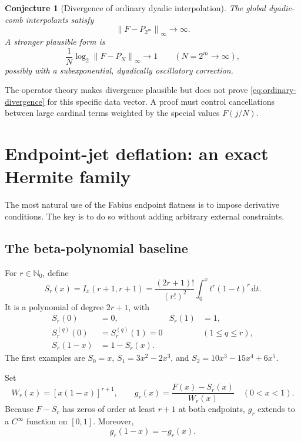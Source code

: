 \documentclass[11pt,oneside]{article}
\newtheorem{conjecture}[theorem]{Conjecture}
\theoremstyle{definition}
\theoremstyle{remark}
\newcommand{\N}{\mathbb N}
\newcommand{\dd}{\,\mathrm d}
\newcommand{\norm}[1]{\left\lVert #1\right\rVert}
\begin{document}
\begin{conjecture}[Divergence of ordinary dyadic interpolation]
\label{conj:ordinary-divergence}
The global dyadic-comb interpolants satisfy
\begin{equation}
 \norm{F-P_{2^m}}_\infty\longrightarrow\infty.
 \label{eq:ordinary-divergence}
\end{equation}
A stronger plausible form is
\begin{equation}
 \frac{1}{N}\log_2\norm{F-P_N}_\infty\longrightarrow1
 \qquad(N=2^m\to\infty),
 \label{eq:ordinary-rate-conj}
\end{equation}
possibly with a subexponential, dyadically oscillatory correction.
\end{conjecture}

The operator theory makes divergence plausible but does not prove \eqref{eq:ordinary-divergence} for this specific data vector.  A proof must control cancellations between large cardinal terms weighted by the special values $F(j/N)$.

\section{Endpoint-jet deflation: an exact Hermite family}
\label{sec:jet-family}

The most natural use of the Fabius endpoint flatness is to impose derivative conditions.  The key is to do so without adding arbitrary external constraints.

\subsection{The beta-polynomial baseline}

For $r\in\N_0$, define
\begin{equation}
 S_r(x)=I_x(r+1,r+1)
 =\frac{(2r+1)!}{(r!)^2}\int_0^x t^r(1-t)^r\dd t.
 \label{eq:smoothstep}
\end{equation}
It is a polynomial of degree $2r+1$, with
\begin{align}
 S_r(0)&=0,&S_r(1)&=1,\\
 S_r^{(q)}(0)&=S_r^{(q)}(1)=0&& (1\le q\le r),\label{eq:smoothstep-jets}\\
 S_r(1-x)&=1-S_r(x).\label{eq:smoothstep-sym}
\end{align}
The first examples are $S_0=x$, $S_1=3x^2-2x^3$, and $S_2=10x^3-15x^4+6x^5$.

Set
\begin{equation}
 W_r(x)=[x(1-x)]^{r+1},
 \qquad
 g_r(x)=\frac{F(x)-S_r(x)}{W_r(x)}\quad(0<x<1).
 \label{eq:def-g}
\end{equation}
Because $F-S_r$ has zeros of order at least $r+1$ at both endpoints, $g_r$ extends to a $C^\infty$ function on $[0,1]$.  Moreover,
\begin{equation}
 g_r(1-x)=-g_r(x).
 \label{eq:g-antisym}
\end{equation}
\end{document}
